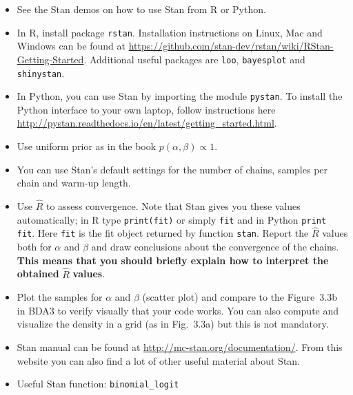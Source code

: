 \documentclass[a4paper,11pt]{article}
\begin{document}
\begin{itemize}
\item See the Stan demos on how to use Stan from R or Python.
\item In R, install package {\tt rstan}. Installation instructions on Linux, Mac and Windows can be found at \url{https://github.com/stan-dev/rstan/wiki/RStan-Getting-Started}. Additional useful packages are {\tt loo}, {\tt bayesplot} and {\tt shinystan}.
\item In Python, you can use Stan by importing the module {\tt pystan}. To install the Python interface to your own laptop, follow instructions here \url{http://pystan.readthedocs.io/en/latest/getting_started.html}.
\item Use uniform prior as in the book $p(\alpha,\beta)\propto 1$.
\item You can use Stan's default settings for the  number of chains, samples per chain and warm-up length. 
\item Use $\hat{R}$ to assess convergence. Note that Stan gives you these values automatically; in R type {\tt print(fit)} or simply {\tt fit} and in Python {\tt print fit}. Here {\tt fit} is the fit object returned by function {\tt stan}. Report the $\hat R$ values both for $\alpha$ and $\beta$ and draw conclusions about the convergence of the chains.
\textbf{This means that you should briefly explain how to interpret the obtained} $\hat R$ \textbf{values}.
\item Plot the samples for $\alpha$ and $\beta$ (scatter plot) and compare to the Figure~3.3b in BDA3 to verify visually that your code works. You can also compute and visualize the density in a grid (as in Fig.~3.3a) but this is not mandatory.
\item Stan manual can be found at \url{http://mc-stan.org/documentation/}. From this website you can also find a lot of other useful material about Stan. 
\item Useful Stan function: {\tt binomial\_logit}

\end{itemize}
\end{document}
